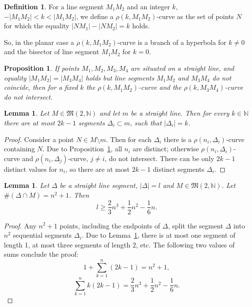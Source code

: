 \documentclass[a4paper,14pt]{article} %
\theoremstyle{plain}
\newtheorem{lemma}[theorem]{Lemma}
\newtheorem{proposition}[theorem]{Proposition}
\theoremstyle{definition}
\newtheorem{definition}[theorem]{Definition}
\begin{document}
\begin{definition}
	For a line segment $M_1 M_2$ and an integer $k$, $-|M_1 M_2| < k < |M_1 M_2|$,
	we define a $\rho(k,M_1 M_2)$-curve as the set of points $N$
	for which the equality $|N M_1| - |N M_2| = k$ holds.
\end{definition}
So, in the planar case a $\rho(k,M_1 M_2)$-curve
is a branch of a hyperbola for $k\neq 0$ and the bisector of line segment $M_1 M_2$ for $k=0$.

\begin{proposition}
	\label{obs:rho_curves}
	If points $M_1,M_2,M_3,M_4$ are situated on a straight line,
	and equality $|M_1 M_2| = |M_3 M_4|$ holds but line segments $M_1 M_2$ and $M_3 M_4$ do not coincide,
	then for a fixed $k$ the $\rho(k,M_1 M_2)$-curve and the $\rho(k,M_3 M_4)$-curve
	do not intersect.
\end{proposition}

\begin{lemma}
	\label{lem:2k-1_segments}
	Let $M \in \mathfrak{M}(2,\mathbb{N})$ and let $m$ be a straight line.
	Then for every $k\in\mathbb{N}$ there are at most $2k-1$ segments $\Delta_i \subset m$,
	such that $|\Delta_i| = k$.
\end{lemma}
\begin{proof}
	Consider a point $N\in M \setminus m$.
	Then for each $\Delta_i$ there is a $\rho(n_i,\Delta_i)$-curve containing $N$.
	Due to Proposition~\ref{obs:rho_curves}, all $n_i$ are distinct;
	otherwise $\rho(n_i,\Delta_i)$-curve and $\rho(n_i,\Delta_j)$-curve, $j\neq i$, do not intersect.
	There can be only $2k-1$ distinct values for $n_i$,
	so there are at most $2k-1$ distinct segments $\Delta_i$.
\end{proof}

\begin{lemma}
	\label{lem:line_segment_with n_squared_plus_one_points}
	Let $\Delta$ be a straight line segment, $|\Delta|=l$ and $M \in \mathfrak{M}(2,\mathbb{N})$.
	Let $\#(\Delta \cap M) = n^2 + 1$.
	Then
	\begin{equation}
		l \geq \frac{2}{3}n^3+\frac{1}{2}n^2-\frac{1}{6}n
		.
	\end{equation}
\end{lemma}

\begin{proof}
	Any $n^2+1$ points, including the endpoints of $\Delta$, split the segment $\Delta$ into $n^2$
	sequential segments $\Delta_i$.
	Due to Lemma~\ref{lem:2k-1_segments}, there is at most one segment of length 1,
	at most three segments of length 2, etc.
	The following two values of sums conclude the proof:
	\begin{equation}
		1 + \sum_{k=1}^n (2k-1) = n^2 + 1
		,
	\end{equation}
	\begin{equation}
		\sum_{k=1}^n k(2k-1) = \frac{2}{3}n^3+\frac{1}{2}n^2-\frac{1}{6}n
		.
	\end{equation}
\end{proof}
\end{document}
